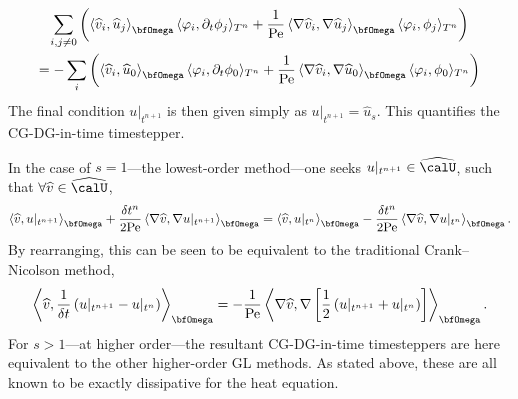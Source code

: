 \begin{example}
\begin{align}
      \end{align}
      \vspace{-8mm}
      \begin{multline}
          \sum_{i, j \neq 0}\left(\left\langle\widehat{v}_{i}, \widehat{u}_{j}\right\rangle_{\bfOmega}\langle\varphi_{i}, \partial_{t}\phi_{j}\rangle_{T^{n}} + \frac{1}{\rmPe}\left\langle\nabla\widehat{v}_{i}, \nabla\widehat{u}_{j}\right\rangle_{\bfOmega}\langle\varphi_{i}, \phi_{j}\rangle_{T^{n}}\right)  \\
          =  - \sum_{i}\left(\left\langle\widehat{v}_{i}, \widehat{u}_{0}\right\rangle_{\bfOmega}\langle\varphi_{i}, \partial_{t}\phi_{0}\rangle_{T^{n}} + \frac{1}{\rmPe}\left\langle\nabla\widehat{v}_{i}, \nabla\widehat{u}_{0}\right\rangle_{\bfOmega}\langle\varphi_{i}, \phi_{0}\rangle_{T^{n}}\right)
      \end{multline}
      The final condition $u|_{t^{n + 1}}$ is then given simply as $u|_{t^{n + 1}}  =  \widehat{u}_{s}$. This quantifies the CG-DG-in-time timestepper.
    \end{example}

    In the case of $s  =  1$---the lowest-order method---one seeks $u|_{t^{n + 1}}  \in  \widehat{\calU}$, such that $\forall \widehat{v}  \in  \widehat{\calU}$,
    \begin{equation}
        \left\langle\widehat{v}, u|_{t^{n + 1}}\right\rangle_{\bfOmega} + \frac{\delta t^{n}}{2\rmPe}\left\langle\nabla\widehat{v}, \nabla u|_{t^{n + 1}}\right\rangle_{\bfOmega}  =  \left\langle\widehat{v}, u|_{t^{n}}\right\rangle_{\bfOmega} - \frac{\delta t^{n}}{2\rmPe}\left\langle\nabla\widehat{v}, \nabla u|_{t^{n}}\right\rangle_{\bfOmega}.
    \end{equation}
    By rearranging, this can be seen to be equivalent to the traditional Crank--Nicolson method,
    \begin{equation}
        \left\langle\widehat{v}, \frac{1}{\delta t}\left(u|_{t^{n + 1}} - u|_{t^{n}}\right)\right\rangle_{\bfOmega}  =  - \frac{1}{\rmPe}\left\langle\nabla\widehat{v}, \nabla\left[\frac{1}{2}\left(u|_{t^{n + 1}} + u|_{t^{n}}\right)\right]\right\rangle_{\bfOmega}.
    \end{equation}
    For $s  >  1$---at higher order---the resultant CG-DG-in-time timesteppers are here equivalent to the other higher-order GL methods. As stated above, these are all known to be exactly dissipative for the heat equation.
    
